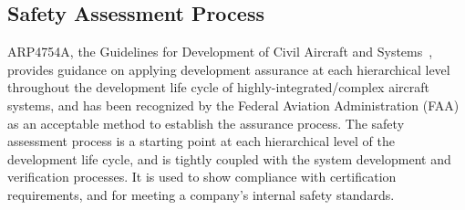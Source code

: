 \subsection{Safety Assessment Process}
\label{subsec:process}

ARP4754A, the Guidelines for Development of Civil Aircraft and Systems~\cite{SAE:ARP4754A}, provides guidance on applying development assurance at each hierarchical level throughout the development life cycle of highly-integrated/complex aircraft systems, and has been recognized by the Federal Aviation Administration (FAA) as an acceptable method to establish the assurance process. The safety assessment process is a starting point at each hierarchical level of the development life cycle, and is tightly coupled with the system development and verification processes. It is used to show compliance with certification requirements, and for meeting a company's internal safety standards. 

	


